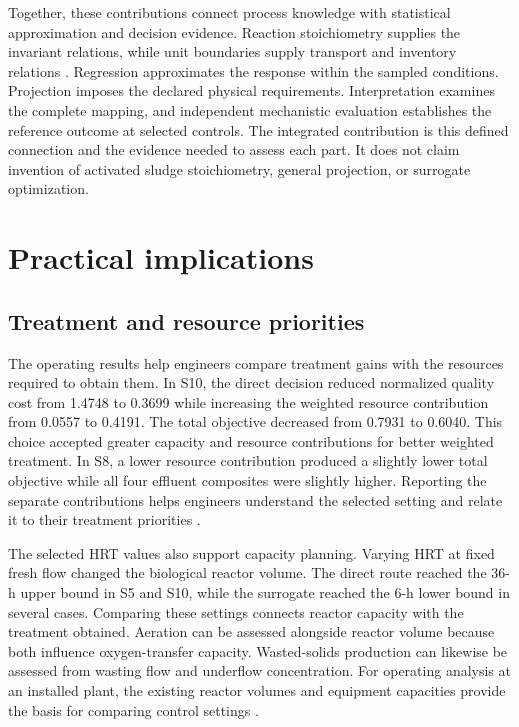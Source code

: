 Together, these contributions connect process knowledge with statistical approximation and decision evidence. Reaction stoichiometry supplies the invariant relations, while unit boundaries supply transport and inventory relations \citep{Henze2006,Alex2008}. Regression approximates the response within the sampled conditions. Projection imposes the declared physical requirements. Interpretation examines the complete mapping, and independent mechanistic evaluation establishes the reference outcome at selected controls. The integrated contribution is this defined connection and the evidence needed to assess each part. It does not claim invention of activated sludge stoichiometry, general projection, or surrogate optimization.

\section{Practical implications}
\label{sec:assessment_practical_implications}

\subsection{Treatment and resource priorities}

The operating results help engineers compare treatment gains with the resources required to obtain them. In S10, the direct decision reduced normalized quality cost from 1.4748 to 0.3699 while increasing the weighted resource contribution from 0.0557 to 0.4191. The total objective decreased from 0.7931 to 0.6040. This choice accepted greater capacity and resource contributions for better weighted treatment. In S8, a lower resource contribution produced a slightly lower total objective while all four effluent composites were slightly higher. Reporting the separate contributions helps engineers understand the selected setting and relate it to their treatment priorities \citep{PadronPaez2020,Aboagye2021}.

The selected HRT values also support capacity planning. Varying HRT at fixed fresh flow changed the biological reactor volume. The direct route reached the 36-h upper bound in S5 and S10, while the surrogate reached the 6-h lower bound in several cases. Comparing these settings connects reactor capacity with the treatment obtained. Aeration can be assessed alongside reactor volume because both influence oxygen-transfer capacity. Wasted-solids production can likewise be assessed from wasting flow and underflow concentration. For operating analysis at an installed plant, the existing reactor volumes and equipment capacities provide the basis for comparing control settings \citep{Henze2008,Miederer2025}.

